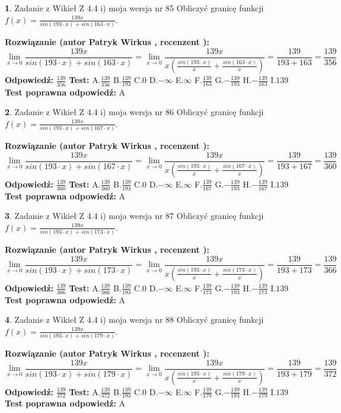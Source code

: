\documentclass[12pt, a4paper]{article}
\theoremstyle{definition} %
\newtheorem{zad}{}
\newcommand{\zadStart}[1]{\begin{zad}#1\newline}
\newcommand{\zadStop}{\end{zad}}
\newcommand{\rozwStart}[2]{\noindent \textbf{Rozwiązanie (autor #1 , recenzent #2): }\newline}
\newcommand{\rozwStop}{\newline}
\newcommand{\odpStart}{\noindent \textbf{Odpowiedź:}\newline}
\newcommand{\odpStop}{\newline}
\newcommand{\testStart}{\noindent \textbf{Test:}\newline}
\newcommand{\testStop}{\newline}
\newcommand{\kluczStart}{\noindent \textbf{Test poprawna odpowiedź:}\newline}
\newcommand{\kluczStop}{\newline}
\begin{document}
\zadStart{Zadanie z Wikieł Z 4.4 i) moja wersja nr 85}
Obliczyć granicę funkcji $f(x)=\frac{139x}{sin(193\cdot x) +sin(163\cdot x)}$.
\zadStop
\rozwStart{Patryk Wirkus}{}
$$\lim\limits_{x\to 0}\frac{139x}{sin(193\cdot x) +sin(163\cdot x)}=\lim\limits_{x\to 0}\frac{139x}{x(\frac{sin(193\cdot x)}{x}+\frac{sin(163\cdot x)}{x})}=\frac{139}{193+163} = \frac{139}{356}$$
\rozwStop
\odpStart
$\frac{139}{356}$
\odpStop
\testStart
A.$\frac{139}{356}$
B.$\frac{139}{193}$
C.$0$
D.$-\infty$
E.$\infty$
F.$\frac{139}{163}$
G.$-\frac{139}{193}$
H.$-\frac{139}{163}$
I.$139$
\testStop
\kluczStart
A
\kluczStop



\zadStart{Zadanie z Wikieł Z 4.4 i) moja wersja nr 86}
Obliczyć granicę funkcji $f(x)=\frac{139x}{sin(193\cdot x) +sin(167\cdot x)}$.
\zadStop
\rozwStart{Patryk Wirkus}{}
$$\lim\limits_{x\to 0}\frac{139x}{sin(193\cdot x) +sin(167\cdot x)}=\lim\limits_{x\to 0}\frac{139x}{x(\frac{sin(193\cdot x)}{x}+\frac{sin(167\cdot x)}{x})}=\frac{139}{193+167} = \frac{139}{360}$$
\rozwStop
\odpStart
$\frac{139}{360}$
\odpStop
\testStart
A.$\frac{139}{360}$
B.$\frac{139}{193}$
C.$0$
D.$-\infty$
E.$\infty$
F.$\frac{139}{167}$
G.$-\frac{139}{193}$
H.$-\frac{139}{167}$
I.$139$
\testStop
\kluczStart
A
\kluczStop



\zadStart{Zadanie z Wikieł Z 4.4 i) moja wersja nr 87}
Obliczyć granicę funkcji $f(x)=\frac{139x}{sin(193\cdot x) +sin(173\cdot x)}$.
\zadStop
\rozwStart{Patryk Wirkus}{}
$$\lim\limits_{x\to 0}\frac{139x}{sin(193\cdot x) +sin(173\cdot x)}=\lim\limits_{x\to 0}\frac{139x}{x(\frac{sin(193\cdot x)}{x}+\frac{sin(173\cdot x)}{x})}=\frac{139}{193+173} = \frac{139}{366}$$
\rozwStop
\odpStart
$\frac{139}{366}$
\odpStop
\testStart
A.$\frac{139}{366}$
B.$\frac{139}{193}$
C.$0$
D.$-\infty$
E.$\infty$
F.$\frac{139}{173}$
G.$-\frac{139}{193}$
H.$-\frac{139}{173}$
I.$139$
\testStop
\kluczStart
A
\kluczStop



\zadStart{Zadanie z Wikieł Z 4.4 i) moja wersja nr 88}
Obliczyć granicę funkcji $f(x)=\frac{139x}{sin(193\cdot x) +sin(179\cdot x)}$.
\zadStop
\rozwStart{Patryk Wirkus}{}
$$\lim\limits_{x\to 0}\frac{139x}{sin(193\cdot x) +sin(179\cdot x)}=\lim\limits_{x\to 0}\frac{139x}{x(\frac{sin(193\cdot x)}{x}+\frac{sin(179\cdot x)}{x})}=\frac{139}{193+179} = \frac{139}{372}$$
\rozwStop
\odpStart
$\frac{139}{372}$
\odpStop
\testStart
A.$\frac{139}{372}$
B.$\frac{139}{193}$
C.$0$
D.$-\infty$
E.$\infty$
F.$\frac{139}{179}$
G.$-\frac{139}{193}$
H.$-\frac{139}{179}$
I.$139$
\testStop
\kluczStart
A
\kluczStop
\end{document}
